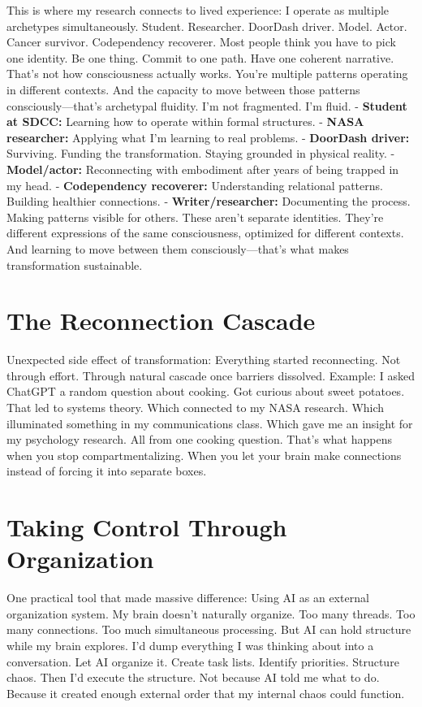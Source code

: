 \documentclass[12pt,openany]{book}
\begin{document}
This is where my research connects to lived experience:
I operate as multiple archetypes simultaneously.
Student. Researcher. DoorDash driver. Model. Actor. Cancer survivor. Codependency recoverer.
Most people think you have to pick one identity.
Be one thing. Commit to one path. Have one coherent narrative.
That's not how consciousness actually works.
You're multiple patterns operating in different contexts. And the capacity to move between those patterns consciously—that's archetypal fluidity.
I'm not fragmented. I'm fluid.
- \textbf{Student at SDCC:} Learning how to operate within formal structures.
- \textbf{NASA researcher:} Applying what I'm learning to real problems.
- \textbf{DoorDash driver:} Surviving. Funding the transformation. Staying grounded in physical reality.
- \textbf{Model/actor:} Reconnecting with embodiment after years of being trapped in my head.
- \textbf{Codependency recoverer:} Understanding relational patterns. Building healthier connections.
- \textbf{Writer/researcher:} Documenting the process. Making patterns visible for others.
These aren't separate identities. They're different expressions of the same consciousness, optimized for different contexts.
And learning to move between them consciously—that's what makes transformation sustainable.

\section{The Reconnection Cascade}

Unexpected side effect of transformation:
Everything started reconnecting.
Not through effort. Through natural cascade once barriers dissolved.
Example:
I asked ChatGPT a random question about cooking. Got curious about sweet potatoes. That led to systems theory. Which connected to my NASA research. Which illuminated something in my communications class. Which gave me an insight for my psychology research.
All from one cooking question.
That's what happens when you stop compartmentalizing. When you let your brain make connections instead of forcing it into separate boxes.

\section{Taking Control Through Organization}

One practical tool that made massive difference:
Using AI as an external organization system.
My brain doesn't naturally organize. Too many threads. Too many connections. Too much simultaneous processing.
But AI can hold structure while my brain explores.
I'd dump everything I was thinking about into a conversation. Let AI organize it. Create task lists. Identify priorities. Structure chaos.
Then I'd execute the structure.
Not because AI told me what to do. Because it created enough external order that my internal chaos could function.
\end{document}
